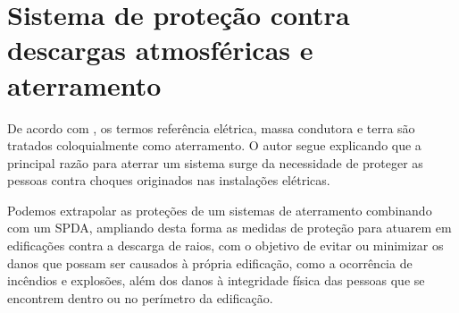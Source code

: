\section{Sistema de proteção contra descargas atmosféricas e aterramento} \label{section: SPDA-ATT}

De acordo com \cite{mattostecnicas}, os termos referência elétrica, massa condutora e terra são tratados coloquialmente como aterramento. O autor segue explicando que a principal razão para aterrar um sistema surge da necessidade de proteger as pessoas contra choques originados nas instalações elétricas.

Podemos extrapolar as proteções de um sistemas de aterramento combinando  com um SPDA, ampliando desta forma as medidas de proteção para  atuarem em edificações contra a descarga de raios, com o objetivo de evitar ou minimizar os danos que possam ser causados à própria edificação, como a ocorrência de incêndios e explosões, além dos danos à integridade física das pessoas que se encontrem dentro ou no perímetro da edificação.







\newpage
